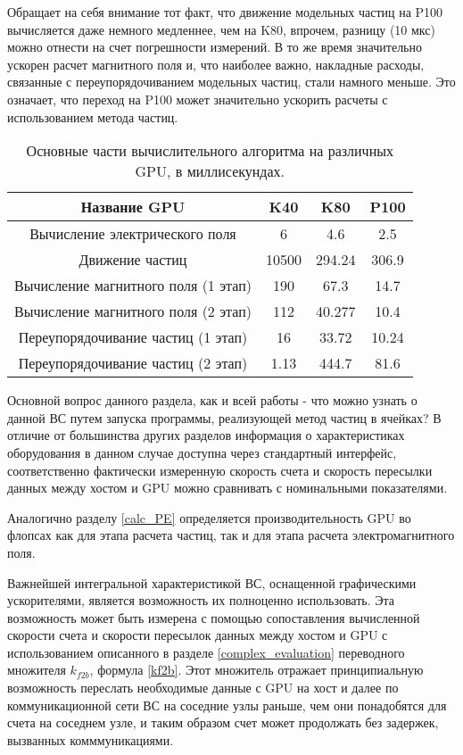 Обращает на себя внимание тот факт, что движение модельных частиц на P100 вычисляется даже немного медленнее, чем на K80, впрочем, разницу (10 мкс) можно отнести на счет погрешности измерений. В то же время значительно ускорен расчет магнитного поля и, что наиболее важно, накладные расходы, связанные с переупорядочиванием модельных частиц, стали намного меньше. Это означает, что  переход на P100 может значительно ускорить расчеты с использованием метода частиц.

\begin{table}[ht]
	\caption{ Основные части вычислительного алгоритма на различных GPU, в миллисекундах.}
	\begin{center}
		\begin{tabular}{|c|c|c|c|}
			\hline
			Название GPU & K40 & K80 & P100\\\hline
			Вычисление электрического поля      & 6    & 4.6     & 2.5    \\\hline
			Движение частиц                     &10500 & 294.24  & 306.9  \\\hline
			Вычисление магнитного поля (1 этап) & 190  & 67.3    & 14.7   \\\hline
			Вычисление магнитного поля (2 этап) & 112  & 40.277  & 10.4   \\ \hline
			Переупорядочивание частиц (1 этап)  & 16   & 33.72   & 10.24  \\ \hline
			Переупорядочивание частиц (2 этап)  & 1.13 & 444.7   & 81.6       \\ \hline
		\end{tabular}
	\end{center}
	\label{tabP100}
\end{table}


Основной вопрос данного раздела, как и всей работы - что можно узнать о данной ВС путем запуска программы, реализующей метод частиц в ячейках? В отличие от 	большинства других разделов информация о характеристиках оборудования в данном случае доступна через стандартный интерфейс, соответственно фактически измеренную скорость счета и скорость пересылки данных между хостом и GPU можно сравнивать с номинальными показателями.

Аналогично разделу \ref{calc_PE} определяется производительность GPU во флопсах как для этапа расчета частиц, так и для этапа расчета электромагнитного поля.

Важнейшей интегральной характеристикой ВС, оснащенной графическими ускорителями, является возможность их полноценно использовать. Эта возможность
может быть измерена с помощью сопоставления вычисленной скорости счета и скорости пересылок данных между хостом и GPU с использованием описанного 
в разделе \ref{complex_evaluation} переводного множителя $k_{f2b}$, формула \ref{kf2b}. Этот множитель отражает принципиальную возможность переслать необходимые данные с GPU на хост и далее по коммуникационной сети ВС на соседние узлы раньше, чем они понадобятся для счета на соседнем узле, и таким образом счет может продолжать без задержек, вызванных комммуникациями.

